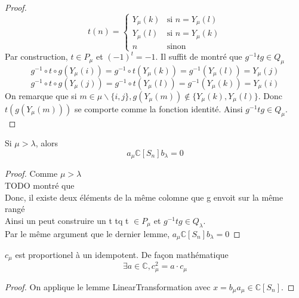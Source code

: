 \begin{proof}
    \[ t(n) = \begin{cases} Y_{\mu}(k) & \text{si } n=Y_{\mu}(l)\\
                            Y_{\mu}(l) & \text{si } n=Y_{\mu}(k)\\
                            n & \text{sinon} 
    \end{cases}\]
    Par construction, $t \in P_{\mu}$ et $(-1)^t = -1$. Il suffit de montré que $g^{-1} t g \in Q_{\mu}$
    \[ g^{-1} \circ t \circ g(Y_{\mu}(i)) = g^{-1} \circ t (Y_{\mu}(k)) = g^{-1}(Y_{\mu}(l)) = Y_{\mu}(j) \]
    \[ g^{-1} \circ t \circ g(Y_{\mu}(j)) = g^{-1} \circ t (Y_{\mu}(l)) = g^{-1}(Y_{\mu}(k)) = Y_{\mu}(i) \]
    On remarque que si $m \in \mu \backslash \{i,j\}, g(Y_{\mu}(m)) \notin \{Y_{\mu}(k), Y_{\mu}(l)\}$. Donc $t(g(Y_{\mu}(m)))$ se comporte comme la fonction identité. Ainsi $g^{-1} t g \in Q_{\mu}$.\\
\end{proof}

\begin{lemma}[SmallerImpZero]
    \label{SmallerImpZero}
    Si $\mu > \lambda$, alors\\
    \[a_{\mu} \mathbb{C}[S_{n}] b_{\lambda} = 0\]
\end{lemma}
\begin{proof}
    Comme $\mu > \lambda$\\
    TODO montré que\\
    Donc, il existe deux éléments de la même colomne que g envoit sur la même rangé\\
    Ainsi un peut construire un t tq t $\in P_{\mu}$ et $g^{-1} t g \in Q_{\lambda}$.\\
    Par le même argument que le dernier lemme, $a_{\mu} \mathbb{C}[S_{n}] b_{\lambda} = 0$
\end{proof}

\begin{lemma}[CuPropIdempotent]
    \label{CuIdempotent}
    $c_{\mu}$ est proportionel à un idempotent. De façon mathématique
    \[\exists a \in \mathbb{C}, c_{\mu}^{2} = a \cdot c_{\mu} \]
\end{lemma}
\begin{proof}
    On applique le lemme LinearTransformation avec $x = b_{\mu} a_{\mu} \in \mathbb{C}[S_{n}]$.
\end{proof}

